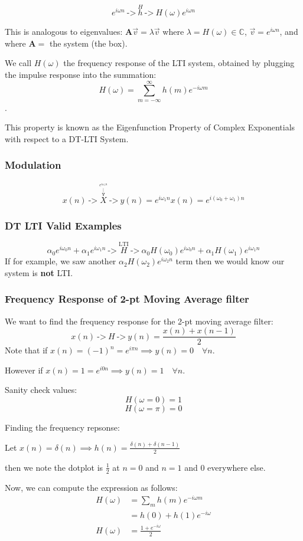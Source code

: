 \[
    e^{i\omega n} \ \texttt{->} \ \boxed{\stackrel H h} \ \texttt{->} \  H(\omega)e^{i\omega n}
\]

This is analogous to eigenvalues: $\mathbf A\vec v=\lambda \vec v$ where $\lambda = H(\omega)\in\mathbb C$, $\vec v = e^{i\omega n}$, and where $\mathbf A=$ the system (the box).

We call $H(\omega)$ the frequency response of the LTI system, obtained by plugging the impulse response into the summation: $$H(\omega)=\sum_{m=-\infty}^\infty h(m) e^{-i\omega m}$$.

This property is known as the Eigenfunction Property of Complex Exponentials with respect to a DT-LTI System.

\subsubsection{Modulation}
\[
  x(n) \ \texttt{->} \ \stackrel{\stackrel{e^{i\omega_1 n}}{\stackrel{|}{\texttt{v}}}}{\boxed{X}} \ \texttt{->} \ y(n) = e^{i\omega_1 n}x(n) = e^{i(\omega_0+\omega_1) n}
\]

\subsubsection{DT LTI Valid Examples}
\[
    \alpha_0e^{i\omega_0 n}+\alpha_1e^{i\omega_1 n} \ \texttt{->} \ \stackrel{\text{LTI}}{\boxed{H}} \ \texttt{->} \  \alpha_0H(\omega_0)e^{i\omega_0 n}
    +
    \alpha_1H(\omega_1)e^{i\omega_1 n}
\]
If for example, we saw another $\alpha_2H(\omega_2)e^{i\omega_2 n}$ term then we would know our system is \textbf{not} LTI.

\subsubsection{Frequency Response of 2-pt Moving Average filter}
We want to find the frequency response for the 2-pt moving average filter:
\[
    x(n) \ \texttt{->} \ \boxed{H} \ \texttt{->} \ y(n) = \frac{x(n)+x(n-1)}2
\]
Note that if $x(n)=(-1)^n=e^{i\pi n}\implies y(n)=0\quad\forall n$.

However if $x(n)=1=e^{i0n}\implies y(n)=1\quad\forall n$.

Sanity check values:
\[
    H(\omega=0) = 1
\]
\[
    H(\omega=\pi) = 0
\]

Finding the frequency repsonse:
\begin{shaded}
Let $x(n)=\delta(n) \implies h(n)=\frac{\delta(n)+\delta(n-1)}2$

then we note the dotplot is $\frac12$ at $n=0$ and $n=1$ and $0$ everywhere else.
\end{shaded}
Now, we can compute the expression as follows:
\begin{align*}
    H(\omega) &= \sum_m h(m) e^{-i\omega m}
    \\
    &= h(0) + h(1) e^{-i\omega}
    \\
    H(\omega) &= \frac{1+e^{-i\omega}}2
\end{align*}

